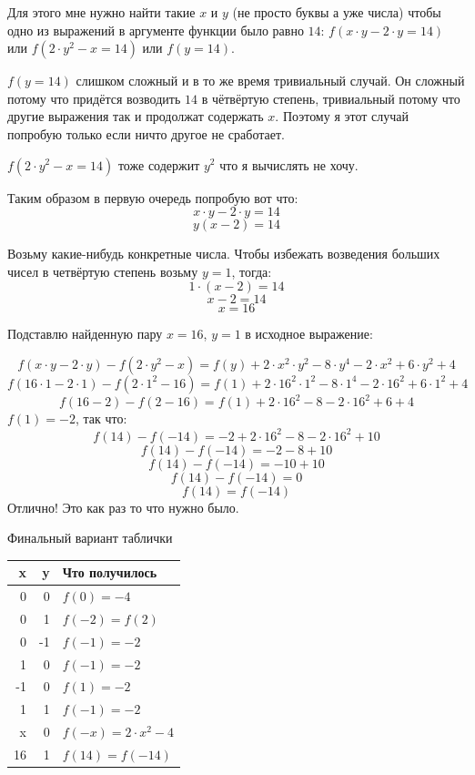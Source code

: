 \documentclass{article}
\begin{document}
Для этого мне нужно найти такие $x$ и $y$ (не просто буквы а уже числа) чтобы одно из выражений в аргументе функции было равно $14$: $f(x\cdot{}y-2\cdot{}y=14)$ или $f(2\cdot{}y^2-x=14)$ или $f(y=14)$.

$f(y=14)$ слишком сложный и в то же время тривиальный случай. Он сложный потому что придётся возводить $14$ в чётвёртую степень, тривиальный потому что другие выражения так и продолжат содержать $x$. Поэтому я этот случай попробую только если ничто другое не сработает.

$f(2\cdot{}y^2-x=14)$ тоже содержит $y^2$ что я вычислять не хочу.

Таким образом в первую очередь попробую вот что:
$$x\cdot{}y-2\cdot{}y=14$$
$$y(x-2)=14$$

Возьму какие-нибудь конкретные числа. Чтобы избежать возведения больших чисел в четвёртую степень возьму $y=1$, тогда:
$$1\cdot{}(x-2)=14$$
$$x-2=14$$
$$x=16$$

Подставлю найденную пару $x=16$, $y=1$ в исходное выражение:

$$f(x\cdot{}y-2\cdot{}y)-f(2\cdot{}y^2-x)=f(y)+2\cdot{}x^2\cdot{}y^2-8\cdot{}y^4-2\cdot{}x^2+6\cdot{}y^2+4$$
$$f(16\cdot{}1-2\cdot{}1)-f(2\cdot{}1^2-16)=f(1)+2\cdot{}16^2\cdot{}1^2-8\cdot{}1^4-2\cdot{}16^2+6\cdot{}1^2+4$$
$$f(16-2)-f(2-16)=f(1)+2\cdot{}16^2-8-2\cdot{}16^2+6+4$$
$f(1)=-2$, так что:
$$f(14)-f(-14)=-2+2\cdot{}16^2-8-2\cdot{}16^2+10$$
$$f(14)-f(-14)=-2-8+10$$
$$f(14)-f(-14)=-10+10$$
$$f(14)-f(-14)=0$$
$$f(14)=f(-14)$$
Отлично! Это как раз то что нужно было.
\begin{samepage}
Финальный вариант таблички
\begin{center}
 \begin{tabular}{r r l}
 \hline
 x & y & Что получилось        \\
 \hline
  0 &  0 & $f(0)=-4$           \\
  0 &  1 & $f(-2)=f(2)$        \\
  0 & -1 & $f(-1)=-2$          \\
  1 &  0 & $f(-1)=-2$          \\
 -1 &  0 & $f(1)=-2$           \\
  1 &  1 & $f(-1)=-2$          \\
  x &  0 & $f(-x)=2\cdot{}x^2-4$ \\
 16 &  1 & $f(14)=f(-14)$ \\
 \hline
 \end{tabular}
\end{center}
\end{samepage}
\end{document}
